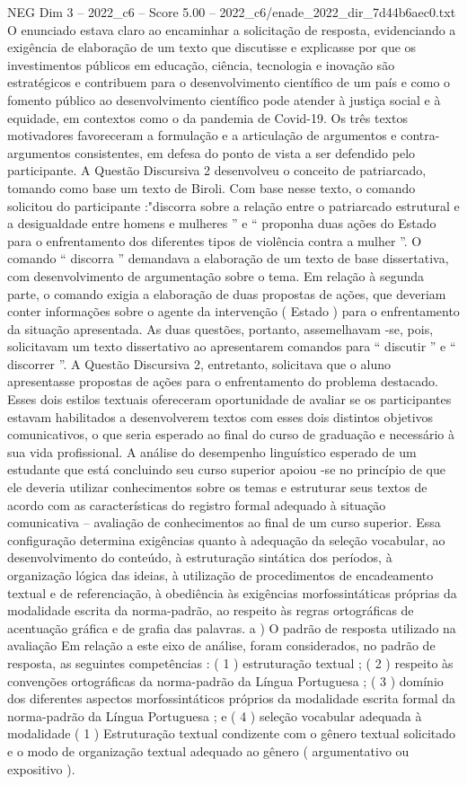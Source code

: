 \begin{textsample}{NEG Dim 3 – 2022\_c6 – Score 5.00 – 2022\_c6/enade\_2022\_dir\_7d44b6aec0.txt}
O enunciado estava claro ao encaminhar a solicitação de resposta, evidenciando a exigência de elaboração de um texto que discutisse e explicasse por que os investimentos públicos em educação, ciência, tecnologia e inovação são estratégicos e contribuem para o desenvolvimento científico de um país e como o fomento público ao desenvolvimento científico pode atender à justiça social e à equidade, em contextos como o da pandemia de Covid-19.
Os três textos motivadores favoreceram a formulação e a articulação de argumentos e contra-argumentos consistentes, em defesa do ponto de vista a ser defendido pelo participante.
A Questão Discursiva 2 desenvolveu o conceito de patriarcado, tomando como base um texto de Biroli.
Com base nesse texto, o comando solicitou do participante :"discorra sobre a relação entre o patriarcado estrutural e a desigualdade entre homens e mulheres ” e “ proponha duas ações do Estado para o enfrentamento dos diferentes tipos de violência contra a mulher ”.
O comando “ discorra ” demandava a elaboração de um texto de base dissertativa, com desenvolvimento de argumentação sobre o tema.
Em relação à segunda parte, o comando exigia a elaboração de duas propostas de ações, que deveriam conter informações sobre o agente da intervenção ( Estado ) para o enfrentamento da situação apresentada.
As duas questões, portanto, assemelhavam -se, pois, solicitavam um texto dissertativo ao apresentarem comandos para “ discutir ” e “ discorrer ”.
A Questão Discursiva 2, entretanto, solicitava que o aluno apresentasse propostas de ações para o enfrentamento do problema destacado.
Esses dois estilos textuais ofereceram oportunidade de avaliar se os participantes estavam habilitados a desenvolverem textos com esses dois distintos objetivos comunicativos, o que seria esperado ao final do curso de graduação e necessário à sua vida profissional.
A análise do desempenho linguístico esperado de um estudante que está concluindo seu curso superior apoiou -se no princípio de que ele deveria utilizar conhecimentos sobre os temas e estruturar seus textos de acordo com as características do registro formal adequado à situação comunicativa – avaliação de conhecimentos ao final de um curso superior.
Essa configuração determina exigências quanto à adequação da seleção vocabular, ao desenvolvimento do conteúdo, à estruturação sintática dos períodos, à organização lógica das ideias, à utilização de procedimentos de encadeamento textual e de referenciação, à obediência às exigências morfossintáticas próprias da modalidade escrita da norma-padrão, ao respeito às regras ortográficas de acentuação gráfica e de grafia das palavras. a ) O padrão de resposta utilizado na avaliação Em relação a este eixo de análise, foram considerados, no padrão de resposta, as seguintes competências : ( 1 ) estruturação textual ; ( 2 ) respeito às convenções ortográficas da norma-padrão da Língua Portuguesa ; ( 3 ) domínio dos diferentes aspectos morfossintáticos próprios da modalidade escrita formal da norma-padrão da Língua Portuguesa ; e ( 4 ) seleção vocabular adequada à modalidade ( 1 ) Estruturação textual condizente com o gênero textual solicitado e o modo de organização textual adequado ao gênero ( argumentativo ou expositivo ).

\end{textsample}
